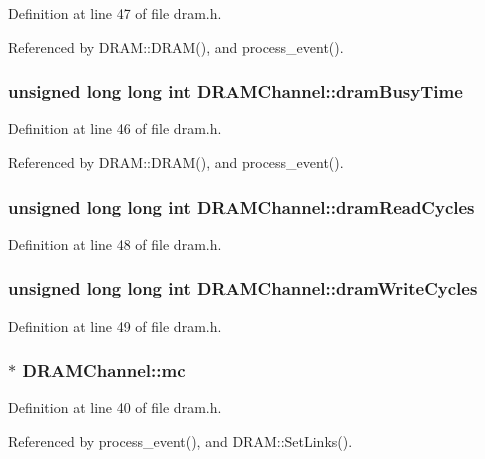 Definition at line 47 of file dram.h.

Referenced by DRAM::DRAM(), and process\_\-event().
\subsubsection[{dramBusyTime}]{\setlength{\rightskip}{0pt plus 5cm}unsigned long long int {\bf DRAMChannel::dramBusyTime}}\label{classDRAMChannel_c6893bec3a02f41d943302c633fe0775}




Definition at line 46 of file dram.h.

Referenced by DRAM::DRAM(), and process\_\-event().
\subsubsection[{dramReadCycles}]{\setlength{\rightskip}{0pt plus 5cm}unsigned long long int {\bf DRAMChannel::dramReadCycles}}\label{classDRAMChannel_f61c93deaa124e78bc893c1be1cf639e}




Definition at line 48 of file dram.h.
\subsubsection[{dramWriteCycles}]{\setlength{\rightskip}{0pt plus 5cm}unsigned long long int {\bf DRAMChannel::dramWriteCycles}}\label{classDRAMChannel_404772e399cc8358af961dd0343194d0}




Definition at line 49 of file dram.h.
\subsubsection[{mc}]{$\ast$ {\bf DRAMChannel::mc}}\label{classDRAMChannel_762802c40d545c267dd9109e1e013d69}




Definition at line 40 of file dram.h.

Referenced by process\_\-event(), and DRAM::SetLinks().
